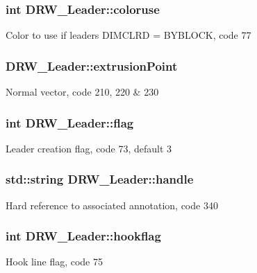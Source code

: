 \subsubsection[{coloruse}]{\setlength{\rightskip}{0pt plus 5cm}int D\+R\+W\+\_\+\+Leader\+::coloruse}\label{class_d_r_w___leader_afdff2ddfa67b8f2f46b367f52e06e027}
Color to use if leader\textquotesingle{}s D\+I\+M\+C\+L\+R\+D = B\+Y\+B\+L\+O\+C\+K, code 77 \hypertarget{class_d_r_w___leader_a9ef3ab714584747ac54612c47edd570a}{}
\subsubsection[{extrusion\+Point}]{ D\+R\+W\+\_\+\+Leader\+::extrusion\+Point}\label{class_d_r_w___leader_a9ef3ab714584747ac54612c47edd570a}
Normal vector, code 210, 220 \& 230 \hypertarget{class_d_r_w___leader_adcf19e8f9d127c910267e37a9d09e828}{}
\subsubsection[{flag}]{\setlength{\rightskip}{0pt plus 5cm}int D\+R\+W\+\_\+\+Leader\+::flag}\label{class_d_r_w___leader_adcf19e8f9d127c910267e37a9d09e828}
Leader creation flag, code 73, default 3 \hypertarget{class_d_r_w___leader_a59ce8c8abeb1764ce3dbf042758d7cfa}{}
\subsubsection[{handle}]{\setlength{\rightskip}{0pt plus 5cm}std\+::string D\+R\+W\+\_\+\+Leader\+::handle}\label{class_d_r_w___leader_a59ce8c8abeb1764ce3dbf042758d7cfa}
Hard reference to associated annotation, code 340 \hypertarget{class_d_r_w___leader_a5d47804340900202fe3d1cd7bebbcecf}{}
\subsubsection[{hookflag}]{\setlength{\rightskip}{0pt plus 5cm}int D\+R\+W\+\_\+\+Leader\+::hookflag}\label{class_d_r_w___leader_a5d47804340900202fe3d1cd7bebbcecf}
Hook line flag, code 75 \hypertarget{class_d_r_w___leader_a80aca0277cc06cbcb4af9c6a42decf06}{}
